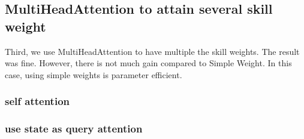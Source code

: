 \subsection{MultiHeadAttention to attain several skill weight}
Third, we use MultiHeadAttention to have multiple the skill weights.
The result was fine.
However, there is not much gain compared to Simple Weight.
In this case, using simple weights is parameter efficient.

\subsubsection{self attention}
\subsubsection{use state as query attention}





